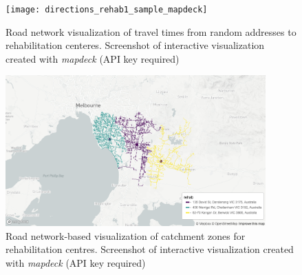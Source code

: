 \documentclass[utf8]{frontiersHLTH}
\begin{document}
\begin{figure}[h!]
\begin{center}
\texttt{[image: directions\_rehab1\_sample\_mapdeck]}
\end{center}
\caption{Road network visualization of travel times from random addresses to rehabilitation centeres. Screenshot of interactive visualization created with {\em mapdeck} (API key required)}\label{fig:RehabCenterAddressDistanceHex}
\end{figure}

\begin{figure}[h!]
\begin{center}
  \includegraphics[width=10cm]{nearest_rehab}
\end{center}
\caption{Road network-based visualization of catchment zones for rehabilitation centres. Screenshot of interactive visualization created with {\em mapdeck} (API key required)}\label{fig:RehabCenterRoadCatchment}
\end{figure}



\end{document}
